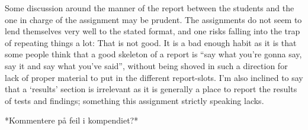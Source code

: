 Some discussion around the manner of the report between the students and the one in charge of the assignment may be prudent. The assignments do not seem to lend themselves very well to the stated format, and one risks falling into the trap of repeating things a lot: That is not good. It is a bad enough habit as it is that some people think that a good skeleton of a report is “say what you’re gonna say, say it and say what you’ve said”, without being shoved in such a direction for lack of proper material to put in the different report-slots.  I’m also inclined to say that a ‘results’ section is irrelevant as it is generally a place to report the results of tests and findings; something this assignment strictly speaking lacks.

*Kommentere på feil i kompendiet?*
